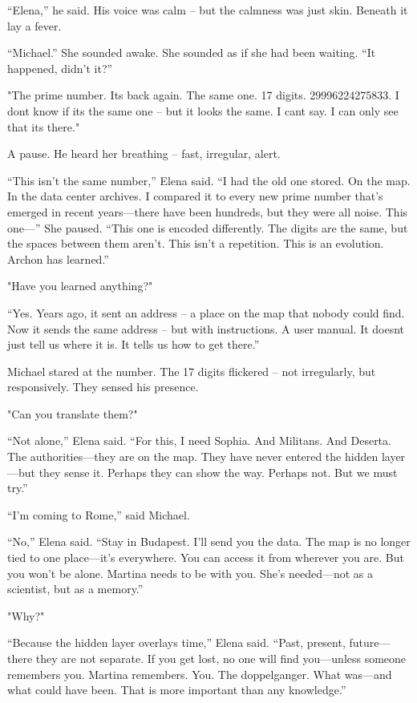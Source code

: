 \documentclass[
]{article}
\begin{document}
``Elena,'' he said. His voice was calm -- but the calmness was just skin. Beneath it lay a fever.

``Michael.'' She sounded awake. She sounded as if she had been waiting. ``It happened, didn't it?''

"The prime number. It\textquotesingle s back again. The same one. 17 digits. 29996224275833. I don\textquotesingle t know if it\textquotesingle s the same one -- but it looks the same. I can\textquotesingle t say. I can only see that it\textquotesingle s there."

A pause. He heard her breathing -- fast, irregular, alert.

``This isn't the same number,'' Elena said. ``I had the old one stored. On the map. In the data center archives. I compared it to every new prime number that's emerged in recent years---there have been hundreds, but they were all noise. This one---'' She paused. ``This one is encoded differently. The digits are the same, but the spaces between them aren't. This isn't a repetition. This is an evolution. Archon has learned.''

"Have you learned anything?"

``Yes. Years ago, it sent an address -- a place on the map that nobody could find. Now it sends the same address -- but with instructions. A user manual. It doesn\textquotesingle t just tell us where it is. It tells us how to get there.''

Michael stared at the number. The 17 digits flickered -- not irregularly, but responsively. They sensed his presence.

"Can you translate them?"

``Not alone,'' Elena said. ``For this, I need Sophia. And Militans. And Deserta. The authorities---they are on the map. They have never entered the hidden layer---but they sense it. Perhaps they can show the way. Perhaps not. But we must try.''

``I'm coming to Rome,'' said Michael.

``No,'' Elena said. ``Stay in Budapest. I'll send you the data. The map is no longer tied to one place---it's everywhere. You can access it from wherever you are. But you won't be alone. Martina needs to be with you. She's needed---not as a scientist, but as a memory.''

"Why?"

``Because the hidden layer overlays time,'' Elena said. ``Past, present, future---there they are not separate. If you get lost, no one will find you---unless someone remembers you. Martina remembers. You. The doppelganger. What was---and what could have been. That is more important than any knowledge.''
\end{document}
